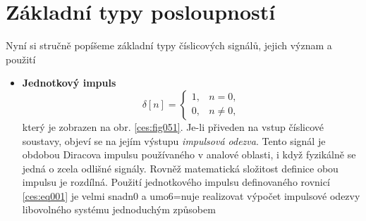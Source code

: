   \section{Základní typy posloupností}\label{ces:IchapIsecII}
    Nyní si stručně popíšeme základní typy číslicových signálů, jejich význam a použití
    \begin{itemize}
      \item \textbf{Jednotkový impuls}
            \begin{equation}\label{ces:eq001}
              \delta[n]=
              \begin{cases} 
                 1, &  n = 0, \\
                 0, &  n \neq 0,
              \end{cases}
            \end{equation}
            který je zobrazen na obr. \ref{ces:fig051}. Je-li přiveden na vstup číslicové soustavy,
            objeví se na jejím výstupu \emph{impulsová odezva}. Tento signál je obdobou Diracova
            impulsu používaného v analové oblasti, i když fyzikálně se jedná o zcela odlišné
            signály. Rovněž matematická složitost definice obou impulsu je rozdílná. Použití
            jednotkového impulsu definovaného rovnicí \ref{ces:eq001} je velmi snadn0 a umo6=nuje
            realizovat výpočet impulsové odezvy libovolného systému jednoduchým způsobem
            


\end{itemize}
